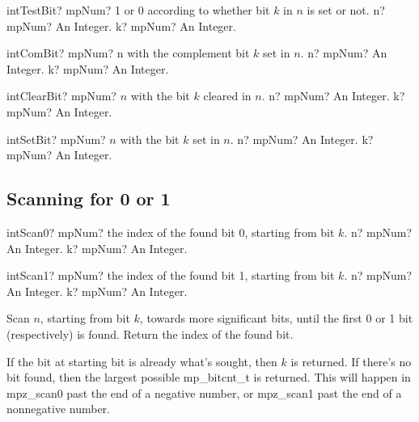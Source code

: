 \begin{mpFunctionsExtract}
	\mpFunctionTwo
	{intTestBit? mpNum? 1 or 0 according to whether bit $k$ in $n$ is set or not.}
	{n? mpNum? An Integer.}
	{k? mpNum? An Integer.}
\end{mpFunctionsExtract}

\vspace{0.3cm}
\begin{mpFunctionsExtract}
	\mpFunctionTwo
	{intComBit? mpNum? n with the complement bit $k$ set in $n$.}
	{n? mpNum? An Integer.}
	{k? mpNum? An Integer.}
\end{mpFunctionsExtract}

\vspace{0.3cm}
\begin{mpFunctionsExtract}
	\mpFunctionTwo
	{intClearBit? mpNum? $n$ with the bit $k$ cleared in $n$.}
	{n? mpNum? An Integer.}
	{k? mpNum? An Integer.}
\end{mpFunctionsExtract}


\vspace{0.3cm}
\begin{mpFunctionsExtract}
	\mpFunctionTwo
	{intSetBit? mpNum? $n$ with the bit $k$ set in $n$.}
	{n? mpNum? An Integer.}
	{k? mpNum? An Integer.}
\end{mpFunctionsExtract}




\subsection{Scanning for 0 or 1}

\begin{mpFunctionsExtract}
	\mpFunctionTwo
	{intScan0? mpNum? the index of the found bit 0, starting from bit $k$.}
	{n? mpNum? An Integer.}
	{k? mpNum? An Integer.}
\end{mpFunctionsExtract}

\vspace{0.3cm}
\begin{mpFunctionsExtract}
	\mpFunctionTwo
	{intScan1? mpNum? the index of the found bit 1, starting from bit $k$.}
	{n? mpNum? An Integer.}
	{k? mpNum? An Integer.}
\end{mpFunctionsExtract}


\vspace{0.3cm}
Scan $n$, starting from bit $k$, towards more significant bits, until the first 0 or 1 bit (respectively) is found. Return the index of the found bit.

If the bit at starting bit is already what’s sought, then $k$ is returned.
If there’s no bit found, then the largest possible mp\_bitcnt\_t is returned. This will happen
in mpz\_scan0 past the end of a negative number, or mpz\_scan1 past the end of a nonnegative
number.



